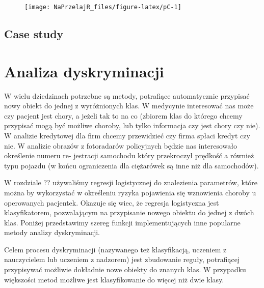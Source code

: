 \documentclass[polish,]{book}
\newenvironment{Shaded}{\begin{snugshade}}{\end{snugshade}}
\newcommand{\CommentTok}[1]{\textcolor[rgb]{0.56,0.35,0.01}{\textit{#1}}}
\newcommand{\DecValTok}[1]{\textcolor[rgb]{0.00,0.00,0.81}{#1}}
\newcommand{\KeywordTok}[1]{\textcolor[rgb]{0.13,0.29,0.53}{\textbf{#1}}}
\newcommand{\NormalTok}[1]{#1}
\newcommand{\OperatorTok}[1]{\textcolor[rgb]{0.81,0.36,0.00}{\textbf{#1}}}
\newcommand{\StringTok}[1]{\textcolor[rgb]{0.31,0.60,0.02}{#1}}
\begin{document}
\begin{figure}[h]

{\centering \texttt{[image: NaPrzelajR\_files/figure-latex/pC-1]} 

}

\end{figure}

\begin{Shaded}
\end{Shaded}

\hypertarget{part_36}{%
\section{Case study}\label{part_36}}

\hypertarget{part_4}{%
\chapter{Analiza dyskryminacji}\label{part_4}}

W wielu dziedzinach potrzebne są metody, potrafiące automatycznie przypisać nowy obiekt do jednej z wyróżnionych klas. W medycynie interesować nas może czy
pacjent jest chory, a jeżeli tak to na co (zbiorem klas do którego chcemy przypisać
mogą być możliwe choroby, lub tylko informacja czy jest chory czy nie). W analizie
kredytowej dla firm chcemy przewidzieć czy firma spłaci kredyt czy nie. W analizie
obrazów z fotoradarów policyjnych będzie nas interesowało określenie numeru re-
jestracji samochodu który przekroczył prędkość a również typu pojazdu (w końcu
ograniczenia dla ciężarówek są inne niż dla samochodów).

W rozdziale ?? używaliśmy regresji logistycznej do znalezienia parametrów, które można by wykorzystać w określeniu ryzyka pojawienia się wznowienia choroby
u operowanych pacjentek. Okazuje się wiec, że regresja logistyczna jest klasyfikatorem, pozwalającym na przypisanie nowego obiektu do jednej z dwóch klas. Poniżej
przedstawimy szereg funkcji implementujących inne popularne metody analizy dyskryminacji.

Celem procesu dyskryminacji (nazywanego też klasyfikacją, uczeniem z nauczycielem lub uczeniem z nadzorem) jest zbudowanie reguły, potrafiącej przypisywać
możliwie dokładnie nowe obiekty do znanych klas. W przypadku większości metod
możliwe jest klasyfikowanie do więcej niż dwie klasy.
\end{document}
